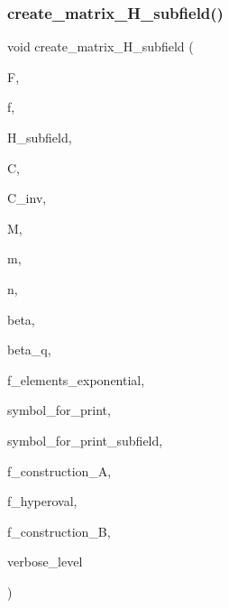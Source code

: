 \subsubsection{\texorpdfstring{create\+\_\+matrix\+\_\+\+H\+\_\+subfield()}{create\_matrix\_H\_subfield()}}
{\footnotesize\ttfamily void create\+\_\+matrix\+\_\+\+H\+\_\+subfield (\begin{DoxyParamCaption}\item[{\mbox{\hyperlink{classfinite__field}{finite\+\_\+field}} $\ast$}]{F,  }\item[{\mbox{\hyperlink{classfinite__field}{finite\+\_\+field}} $\ast$}]{f,  }\item[{\mbox{\hyperlink{galois_8h_a09fddde158a3a20bd2dcadb609de11dc}{I\+NT}} $\ast$}]{H\+\_\+subfield,  }\item[{\mbox{\hyperlink{galois_8h_a09fddde158a3a20bd2dcadb609de11dc}{I\+NT}} $\ast$}]{C,  }\item[{\mbox{\hyperlink{galois_8h_a09fddde158a3a20bd2dcadb609de11dc}{I\+NT}} $\ast$}]{C\+\_\+inv,  }\item[{\mbox{\hyperlink{galois_8h_a09fddde158a3a20bd2dcadb609de11dc}{I\+NT}} $\ast$}]{M,  }\item[{\mbox{\hyperlink{galois_8h_a09fddde158a3a20bd2dcadb609de11dc}{I\+NT}}}]{m,  }\item[{\mbox{\hyperlink{galois_8h_a09fddde158a3a20bd2dcadb609de11dc}{I\+NT}}}]{n,  }\item[{\mbox{\hyperlink{galois_8h_a09fddde158a3a20bd2dcadb609de11dc}{I\+NT}}}]{beta,  }\item[{\mbox{\hyperlink{galois_8h_a09fddde158a3a20bd2dcadb609de11dc}{I\+NT}}}]{beta\+\_\+q,  }\item[{\mbox{\hyperlink{galois_8h_a09fddde158a3a20bd2dcadb609de11dc}{I\+NT}}}]{f\+\_\+elements\+\_\+exponential,  }\item[{const \mbox{\hyperlink{galois_8h_ab6cc7b4aeb6ea31aba2b3fbfc83ff5e6}{B\+Y\+TE}} $\ast$}]{symbol\+\_\+for\+\_\+print,  }\item[{const \mbox{\hyperlink{galois_8h_ab6cc7b4aeb6ea31aba2b3fbfc83ff5e6}{B\+Y\+TE}} $\ast$}]{symbol\+\_\+for\+\_\+print\+\_\+subfield,  }\item[{\mbox{\hyperlink{galois_8h_a09fddde158a3a20bd2dcadb609de11dc}{I\+NT}}}]{f\+\_\+construction\+\_\+A,  }\item[{\mbox{\hyperlink{galois_8h_a09fddde158a3a20bd2dcadb609de11dc}{I\+NT}}}]{f\+\_\+hyperoval,  }\item[{\mbox{\hyperlink{galois_8h_a09fddde158a3a20bd2dcadb609de11dc}{I\+NT}}}]{f\+\_\+construction\+\_\+B,  }\item[{\mbox{\hyperlink{galois_8h_a09fddde158a3a20bd2dcadb609de11dc}{I\+NT}}}]{verbose\+\_\+level }\end{DoxyParamCaption})}

